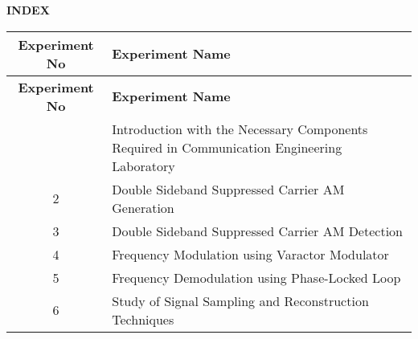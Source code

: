 \documentclass{article}
\begin{document}
\begin{center}
\hspace{3cm}
\textbf{\Large INDEX} 
\end{center}

\begin{longtable}{|c|>{\centering\arraybackslash}p{12cm}|}
\hline
\rowcolor{green!20} 
\textbf{Experiment No} & \textbf{Experiment Name} \\
\hline
\endfirsthead
\hline
\rowcolor{green!20} 
\textbf{Experiment No} & \textbf{Experiment Name} \\
\hline
\endhead
\hline
\endfoot
\hline
\endlastfoot
1 & Introduction with the Necessary Components Required in Communication Engineering Laboratory \\
\hline
2 & Double Sideband Suppressed Carrier AM Generation \\
\hline
3 & Double Sideband Suppressed Carrier AM Detection \\
\hline
4 & Frequency Modulation using Varactor Modulator \\
\hline
5 & Frequency Demodulation using Phase-Locked Loop \\
\hline
6 & Study of Signal Sampling and Reconstruction Techniques \\
\hline
\end{longtable}
\end{document}
